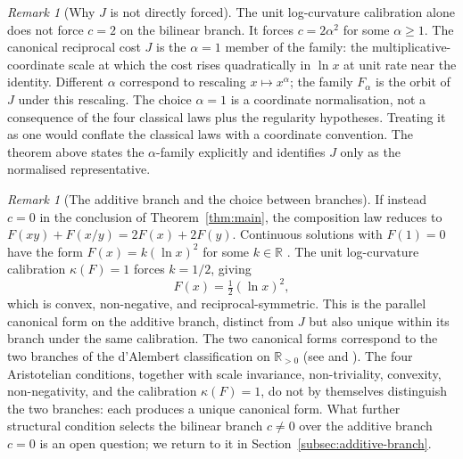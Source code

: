 \documentclass[11pt,a4paper]{article}
\theoremstyle{definition}
\theoremstyle{remark}
\newtheorem{remark}[theorem]{Remark}
\begin{document}
\begin{remark}[Why $J$ is not directly forced]\label{rem:why-J-not-forced}
The unit log-curvature calibration alone does not force $c = 2$ on
the bilinear branch. It forces $c = 2\alpha^2$ for some $\alpha \geq 1$.
The canonical reciprocal cost $J$ is the $\alpha = 1$ member of the
family: the multiplicative-coordinate scale at which the cost rises
quadratically in $\ln x$ at unit rate near the identity. Different
$\alpha$ correspond to rescaling $x \mapsto x^\alpha$; the family
$F_\alpha$ is the orbit of $J$ under this rescaling. The choice
$\alpha = 1$ is a coordinate normalisation, not a consequence of the
four classical laws plus the regularity hypotheses. Treating it as one
would conflate the classical laws with a coordinate convention. The
theorem above states the $\alpha$-family explicitly and identifies $J$
only as the normalised representative.
\end{remark}

\begin{remark}[The additive branch and the choice between branches]
\label{rem:additive-branch}
If instead $c = 0$ in the conclusion of Theorem~\ref{thm:main}, the
composition law reduces to $F(xy) + F(x/y) = 2F(x) + 2F(y)$. Continuous
solutions with $F(1) = 0$ have the form $F(x) = k(\ln x)^2$ for some
$k \in \mathbb{R}$
\cite[Theorem~5(ii)]{WashburnZlatanovicAllahyarov2026}. The unit
log-curvature calibration $\kappa(F) = 1$ forces $k = 1/2$, giving
\[
F(x) = \tfrac{1}{2}(\ln x)^2,
\]
which is convex, non-negative, and reciprocal-symmetric. This is the
parallel canonical form on the additive branch, distinct from $J$ but also
unique within its branch under the same calibration. The two canonical
forms correspond to the two branches of the d'Alembert classification on
$\mathbb{R}_{>0}$ (see
\cite[Remark~9]{WashburnZlatanovicAllahyarov2026} and
\cite[Section~3]{WashburnRahnamai2026}). The four Aristotelian conditions,
together with scale invariance, non-triviality, convexity, non-negativity,
and the calibration $\kappa(F) = 1$, do not by themselves distinguish the
two branches: each produces a unique canonical form. What further
structural condition selects the bilinear branch $c \neq 0$ over the
additive branch $c = 0$ is an open question; we return to it in
Section~\ref{subsec:additive-branch}.
\end{remark}
\end{document}
